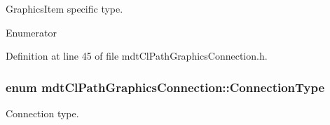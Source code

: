 Graphics\-Item specific type. 

\begin{Desc}
\item[Enumerator]\par
\begin{description}
\item[{\em 
\hypertarget{classmdt_cl_path_graphics_connection_adb7a7919297de79c33962e62655af050a9843d7f20edcdad949a8e3611ca47625}{Type}\label{classmdt_cl_path_graphics_connection_adb7a7919297de79c33962e62655af050a9843d7f20edcdad949a8e3611ca47625}
}]\end{description}
\end{Desc}


Definition at line 45 of file mdt\-Cl\-Path\-Graphics\-Connection.\-h.

\hypertarget{classmdt_cl_path_graphics_connection_af26f48d07af6395c5395d8078facb3a5}{
\subsubsection[{Connection\-Type}]{\setlength{\rightskip}{0pt plus 5cm}enum {\bf mdt\-Cl\-Path\-Graphics\-Connection\-::\-Connection\-Type}}}\label{classmdt_cl_path_graphics_connection_af26f48d07af6395c5395d8078facb3a5}


Connection type. 

